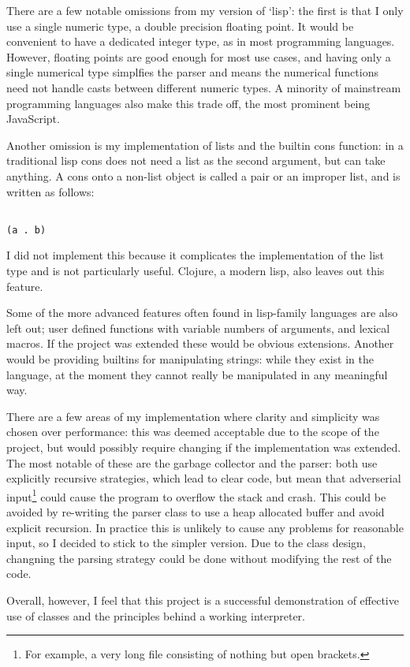 \documentclass[12pt]{article}
\begin{document}
There are a few notable omissions from my version of `lisp': the first
is that I only use a single numeric type, a double precision floating
point. It would be convenient to have a dedicated integer type, as in
most programming languages. However, floating points are good enough
for most use cases, and having only a single numerical type simplfies
the parser and means the numerical functions need not handle casts
between different numeric types. A minority of mainstream programming
languages also make this trade off, the most prominent being
JavaScript.


Another omission is my implementation of lists and the builtin cons
function: in a traditional lisp cons does not need a list as the
second argument, but can take anything. A cons onto a non-list object
is called a pair or an improper list, and is written as follows:

\begin{lstlisting}

(a . b)

\end{lstlisting}

I did not implement this because it complicates the implementation of
the list type and is not particularly useful. Clojure, a modern lisp,
also leaves out this feature.


Some of the more advanced features often found in lisp-family
languages are also left out; user defined functions with variable
numbers of arguments, and lexical macros. If the project was extended
these would be obvious extensions. Another would be providing builtins
for manipulating strings: while they exist in the language, at the
moment they cannot really be manipulated in any meaningful way.


There are a few areas of my implementation where clarity and
simplicity was chosen over performance: this was deemed acceptable due
to the scope of the project, but would possibly require changing if
the implementation was extended. The most notable of these are the
garbage collector and the parser: both use explicitly recursive
strategies, which lead to clear code, but mean that adverserial input\footnote{
For example, a very long file consisting of nothing but open brackets.
}
could cause the program to overflow the stack and crash. This could 
be avoided by re-writing the parser class to use a heap allocated buffer
and avoid explicit recursion. In practice this is unlikely to cause any
problems for reasonable input, so I decided to stick to the simpler version.
Due to the class design, changning the parsing strategy could be done without 
modifying the rest of the code.

Overall, however, I feel that this project is a successful
demonstration of effective use of classes and the principles behind a
working interpreter.
\end{document}
